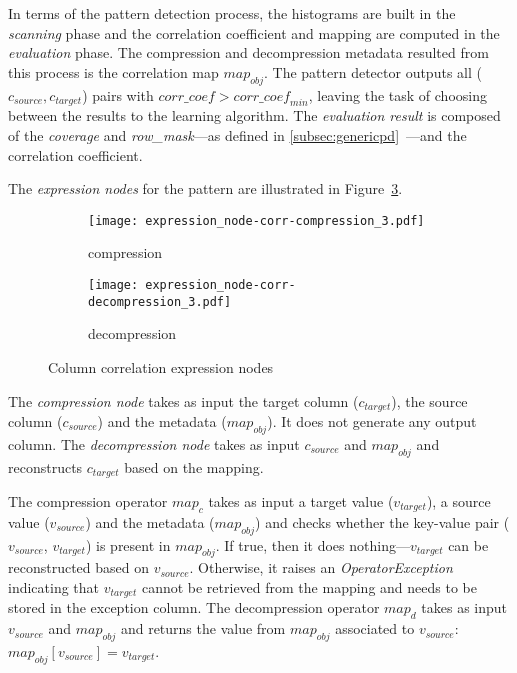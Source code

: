 In terms of the pattern detection process, the histograms are built in the \textit{scanning} phase and the correlation coefficient and mapping are computed in the \textit{evaluation} phase. The compression and decompression metadata resulted from this process is the correlation map \(map_{obj}\). The pattern detector outputs all (\(c_{source}, c_{target}\)) pairs with \(\mathit{corr\_coef} > \mathit{corr\_coef}_{min}\), leaving the task of choosing between the results to the learning algorithm. The \textit{evaluation result} is composed of the \textit{coverage} and \textit{row\_mask}---as defined in \ref{subsec:genericpd}~---and the correlation coefficient.

The \textit{expression nodes} for the  pattern are illustrated in Figure~\ref{fig:pd:columncorrelation:exprnode}.

\begin{figure}[h]
  \centering
  \begin{subfigure}[t]{0.45\linewidth}
    \centering
    \texttt{[image: expression\_node-corr-compression\_3.pdf]}
    \caption[b]{compression}
    \label{fig:pd:columncorrelation:exprnode:compression}
  \end{subfigure}
  \hspace{3em}
  \begin{subfigure}[t]{0.30\linewidth}
    \centering
    \texttt{[image: expression\_node-corr-decompression\_3.pdf]}
    \caption[b]{decompression}
    \label{fig:pd:columncorrelation:exprnode:decompression}
  \end{subfigure}
  \caption{Column correlation expression nodes}
  \label{fig:pd:columncorrelation:exprnode}
\end{figure}

The \textit{compression node} takes as input the target column (\(c_{target}\)), the source column (\(c_{source}\)) and the metadata (\(map_{obj}\)). It does not generate any output column. The \textit{decompression node} takes as input \(c_{source}\) and \(map_{obj}\) and reconstructs \(c_{target}\) based on the mapping.

The compression operator \(map_{c}\) takes as input a target value (\(v_{target}\)), a source value (\(v_{source}\)) and the metadata (\(map_{obj}\)) and checks whether the key-value pair (\(v_{source}\), \(v_{target}\)) is present in \(map_{obj}\). If true, then it does nothing---\(v_{target}\) can be reconstructed based on \(v_{source}\). Otherwise, it raises an \textit{OperatorException} indicating that \(v_{target}\) cannot be retrieved from the mapping and needs to be stored in the exception column. The decompression operator \(map_{d}\) takes as input \(v_{source}\) and \(map_{obj}\) and returns the value from \(map_{obj}\) associated to \(v_{source}\): \(map_{obj}[v_{source}] = v_{target}\).

